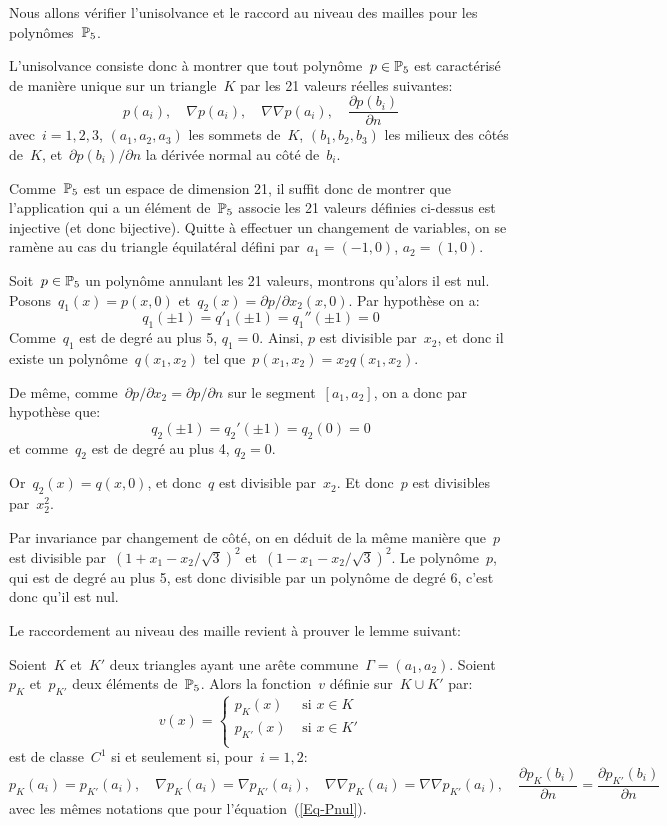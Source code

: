 \medskip
Nous allons vérifier l'unisolvance et le raccord au niveau des mailles pour les polynômes~$\mathbb P_5$.

\medskip
L'unisolvance consiste donc à montrer que tout polynôme~$p\in\mathbb P_5$ est caractérisé de manière unique sur un triangle~$K$ par les 21 valeurs réelles suivantes:
\begin{equation}\label{Eq-Pnul}
p(a_i), \quad \nabla p(a_i), \quad \nabla\nabla p(a_i), \quad \dfrac{\partial p(b_i)}{\partial n}
\end{equation}
avec~$i=1, 2, 3$, $(a_1, a_2, a_3)$ les sommets de~$K$, $(b_1, b_2, b_3)$ les milieux des côtés de~$K$, et~$\partial p(b_i)/\partial n$ la dérivée normal au côté de~$b_i$.

Comme~$\mathbb P_5$ est un espace de dimension 21, il suffit donc de montrer que l'application qui a un élément de~$\mathbb P_5$ associe les 21 valeurs définies ci-dessus est injective (et donc bijective). Quitte à effectuer un changement de variables, on se ramène au cas du triangle équilatéral défini par~$a_1=(-1,0)$, $a_2=(1,0)$. 

\medskip
Soit~$p\in\mathbb P_5$ un polynôme annulant les 21 valeurs, montrons qu'alors il est nul. Posons~$q_1(x)=p(x,0)$ et~$q_2(x)=\partial p/\partial x_2(x,0)$. Par hypothèse on a:
\[ q_1(\pm1)=q'_1(\pm1)=q_1''(\pm1)=0 \]
Comme~$q_1$ est de degré au plus 5, $q_1=0$. Ainsi, $p$ est divisible par~$x_2$, et donc il existe un polynôme~$q(x_1,x_2)$ tel que~$p(x_1,x_2)=x_2q(x_1,x_2)$.

De même, comme~$\partial p/\partial x_2=\partial p/\partial n$ sur le segment~$[a_1,a_2]$, on a donc par hypothèse que:
\[ q_2(\pm1)=q_2'(\pm1)=q_2(0)=0 \]
et comme~$q_2$ est de degré au plus 4, $q_2=0$.

Or~$q_2(x)=q(x,0)$, et donc~$q$ est divisible par~$x_2$.
Et donc~$p$ est divisibles par~$x_2^2$.

Par invariance par changement de côté, on en déduit de la même manière que~$p$ est divisible par~$(1+x_1-x_2/\sqrt3)^2$ et~$(1-x_1-x_2/\sqrt3)^2$.
Le polynôme~$p$, qui est de degré au plus 5, est donc divisible par un polynôme de degré 6, c'est donc qu'il est nul.

\medskip
Le raccordement au niveau des maille revient à prouver le lemme suivant:

Soient~$K$ et~$K'$ deux triangles ayant une arête commune~$\Gamma=(a_1,a_2)$. Soient~$p_K$ et~$p_{K'}$ deux éléments de~$\mathbb P_5$. Alors la fonction~$v$ définie sur~$K\cup K'$ par:
\[v(x)=\left\{\begin{array}{ll} p_K(x) &\text{ si }x\in K\\ p_{K'}(x) &\text{ si }x\in K'\\
\end{array}\right. \]
est de classe~$C^1$ si et seulement si, pour~$i=1,2$:
\begin{equation}\label{Eq-Pcont}
p_K(a_i)=p_{K'}(a_i), \quad \nabla p_K(a_i)=\nabla p_{K'}(a_i), \quad 
\nabla\nabla p_K(a_i)=\nabla\nabla p_{K'}(a_i), 
\quad \dfrac{\partial p_K(b_i)}{\partial n}=\dfrac{\partial p_{K'}(b_i)}{\partial n}
\end{equation}
avec les mêmes notations que pour l'équation~(\ref{Eq-Pnul}).


